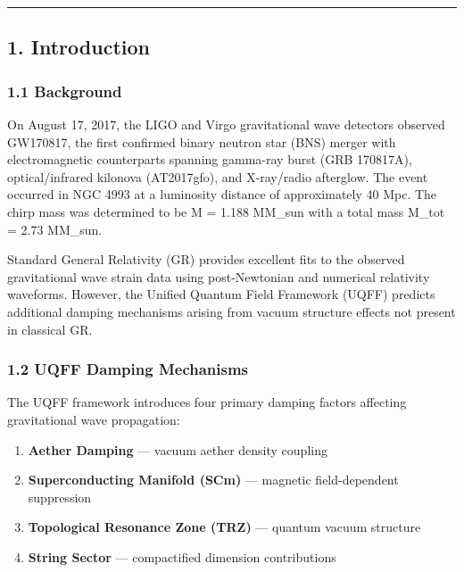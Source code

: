 \documentclass[
  11pt,
]{article}
\providecommand{\tightlist}{%
  \setlength{\itemsep}{0pt}\setlength{\parskip}{0pt}}
\begin{document}
\begin{center}\rule{0.5\linewidth}{0.5pt}\end{center}

\subsection{1. Introduction}\label{introduction}

\subsubsection{1.1 Background}\label{background}

On August 17, 2017, the LIGO and Virgo gravitational wave detectors
observed GW170817, the first confirmed binary neutron star (BNS) merger
with electromagnetic counterparts spanning gamma-ray burst (GRB
170817A), optical/infrared kilonova (AT2017gfo), and X-ray/radio
afterglow. The event occurred in NGC 4993 at a luminosity distance of
approximately 40 Mpc. The chirp mass was determined to be M = 1.188
MM\_sun with a total mass M\_tot = 2.73 MM\_sun.

Standard General Relativity (GR) provides excellent fits to the observed
gravitational wave strain data using post-Newtonian and numerical
relativity waveforms. However, the Unified Quantum Field Framework
(UQFF) predicts additional damping mechanisms arising from vacuum
structure effects not present in classical GR.

\subsubsection{1.2 UQFF Damping
Mechanisms}\label{uqff-damping-mechanisms}

The UQFF framework introduces four primary damping factors affecting
gravitational wave propagation:

\begin{enumerate}
\def\labelenumi{\arabic{enumi}.}
\tightlist
\item
  \textbf{Aether Damping} --- vacuum aether density coupling
\item
  \textbf{Superconducting Manifold (SCm)} --- magnetic field-dependent
  suppression
\item
  \textbf{Topological Resonance Zone (TRZ)} --- quantum vacuum structure
\item
  \textbf{String Sector} --- compactified dimension contributions
\end{enumerate}
\end{document}
